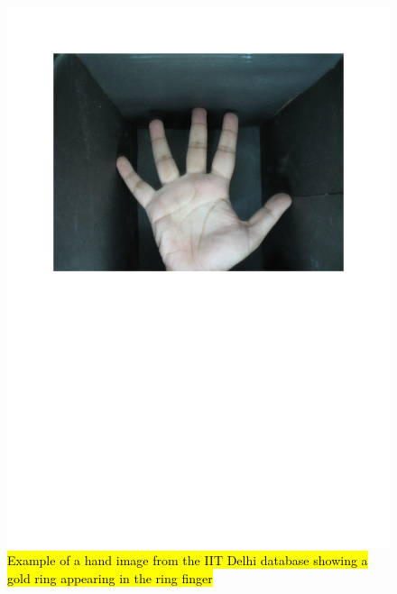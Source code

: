 \documentclass[review]{elsarticle}
\begin{document}
		\begin{figure}[!h]
			\centering
			\includegraphics[page=9,scale=.57,trim=1cm 14.7cm 1cm 1.7cm,clip]{IIT_problematic.pdf}
			\caption{\hl{Example of a hand image from the IIT Delhi database showing a gold ring appearing in the ring finger}}
			\label{fig:IIT_problematic_rings1}
		\end{figure}
\end{document}
